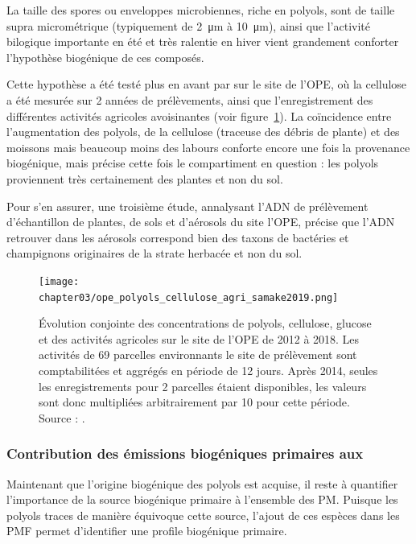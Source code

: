 La taille des spores ou enveloppes microbiennes, riche en polyols, sont de taille supra
micrométrique (typiquement de \SI{2}{\micro\m} à \SI{10}{\micro\m}), ainsi que l'activité
bilogique importante en été et très ralentie en hiver vient grandement conforter
l'hypothèse biogénique de ces composés.

Cette hypothèse a été testé plus en avant par \cite{samakeArabitol2019} sur le site de
l'OPE, où la cellulose a été mesurée sur 2 années de prélèvements, ainsi que
l'enregistrement des différentes activités agricoles avoisinantes (voir
figure~\ref{fig:ope_polyols_cellullose_agri}).
La coïncidence entre l'augmentation des polyols, de la cellulose (traceuse des débris de
plante) et des moissons mais beaucoup moins des labours conforte encore une fois la provenance
biogénique, mais précise cette fois le compartiment en question : les polyols proviennent
très certainement des plantes et non du sol.

Pour s'en assurer, une troisième étude, annalysant l'ADN de prélèvement d'échantillon
de plantes, de sols et d'aérosols du site l'OPE, \autocite{samakeHigh2020} précise que
l'ADN retrouver dans les aérosols correspond bien des taxons de bactéries et champignons
originaires de la strate herbacée et non du sol.

\begin{figure}[ht]
    \centering
    \texttt{[image: chapter03/ope\_polyols\_cellulose\_agri\_samake2019.png]}
    \caption{
        Évolution conjointe des concentrations de polyols, cellulose, glucose et des
        activités agricoles sur le site de l'OPE de 2012 à 2018.
        Les activités de 69 parcelles environnants le site de prélèvement sont
        comptabilitées et aggrégés en période de 12 jours.
        Après 2014, seules les enregistrements pour 2 parcelles étaient disponibles, les
        valeurs sont donc multipliées arbitrairement par 10 pour cette période.
        Source : \cite[figure 6]{samakeArabitol2019}.
    }%
    \label{fig:ope_polyols_cellullose_agri}
\end{figure}

\subsubsection{Contribution des émissions biogéniques primaires aux \PMdix}%
\label{ssub:contribution_des_émissions_biogéniques_primaires_aux_pmdix}

Maintenant que l'origine biogénique des polyols est acquise, il reste à quantifier
l'importance de la source biogénique primaire à l'ensemble des PM.
Puisque les polyols traces de manière équivoque cette source, l'ajout de ces espèces dans
les PMF permet d'identifier une profile biogénique primaire.

